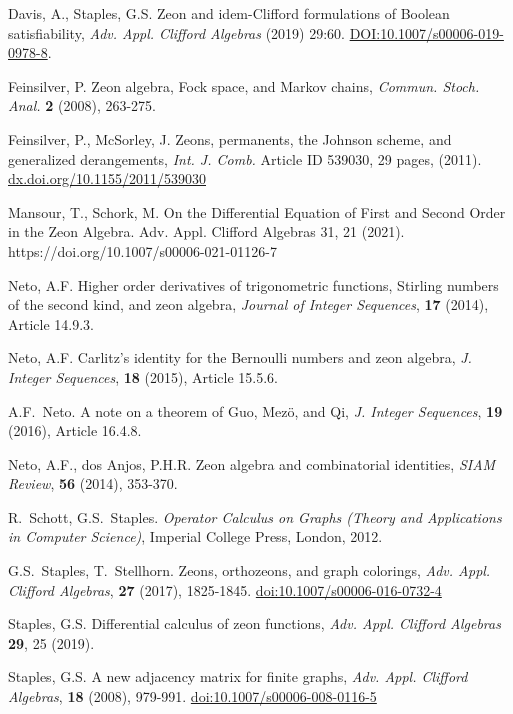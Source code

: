 \documentclass{article}
\theoremstyle{definition}
\numberwithin{equation}{section}
\begin{document}
\begin{thebibliography}{}

 Davis, A., Staples, G.S. Zeon and idem-Clifford formulations of Boolean satisfiability, {\it Adv. Appl. Clifford Algebras } (2019) 29:60.
\url{DOI:10.1007/s00006-019-0978-8}. 

 Feinsilver, P.  Zeon algebra, Fock space, and Markov chains, {\em Commun. Stoch. Anal.} {\bf 2} (2008), 263-275.
 
 Feinsilver, P., McSorley, J.  Zeons, permanents, the Johnson scheme, and generalized derangements, {\em Int. J. Comb.} Article ID 539030, 29 pages, (2011).\\ \url{dx.doi.org/10.1155/2011/539030}

 Mansour, T., Schork, M. On the Differential Equation of First and Second Order in the Zeon Algebra. Adv. Appl. Clifford Algebras 31, 21 (2021). https://doi.org/10.1007/s00006-021-01126-7

 Neto, A.F. Higher order derivatives of trigonometric functions, Stirling numbers of the second kind, and zeon algebra,  {\em Journal of Integer Sequences}, {\bf 17} (2014), Article 14.9.3.

 Neto, A.F. Carlitz's identity for the Bernoulli numbers and zeon algebra, {\em  J. Integer Sequences}, {\bf 18} (2015), Article 15.5.6.

 A.F.~Neto. A note on a theorem of Guo, Mez\"{o}, and Qi,  {\em J. Integer Sequences}, {\bf 19} (2016), Article 16.4.8.

 Neto, A.F., dos Anjos, P.H.R. Zeon algebra and combinatorial identities, {\em SIAM Review}, {\bf 56} (2014), 353-370.

 R.~Schott, G.S.~Staples. {\it Operator Calculus on Graphs (Theory and Applications in Computer Science)},  Imperial College Press, London, 2012.  

 G.S.~Staples, T.~Stellhorn.  Zeons, orthozeons, and graph colorings, {\it Adv. Appl. Clifford Algebras}, {\bf 27} (2017), 1825-1845. \url{doi:10.1007/s00006-016-0732-4}

  
 Staples, G.S. Differential calculus of zeon functions, {\it Adv. Appl. Clifford Algebras} {\bf 29}, 25 (2019).


 Staples, G.S. A new adjacency matrix for finite graphs, {\it Adv. Appl. Clifford Algebras}, {\bf 18} (2008), 979-991.  \url{doi:10.1007/s00006-008-0116-5}


\end{thebibliography}
\end{document}
